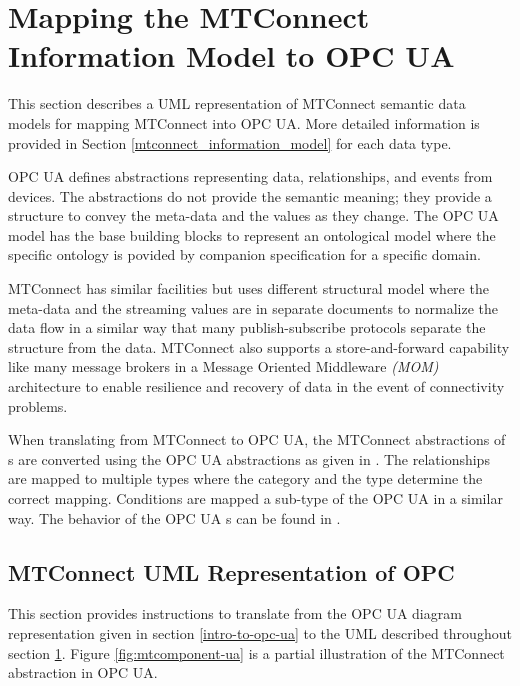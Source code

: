 \clearpage
\section{Mapping the MTConnect Information Model to OPC UA} 
  \label{mtconnect-mapping}

This section describes a UML representation of MTConnect semantic data models for mapping MTConnect into OPC UA. More detailed information is provided in Section \ref{mtconnect_information_model} for each data type.

OPC UA defines abstractions representing data, relationships, and events from devices. The abstractions do not provide the semantic meaning; they provide a structure to convey the meta-data and the values as they change. The OPC UA model has the base building blocks to represent an ontological model where the specific ontology is povided by companion specification for a specific domain.

MTConnect has similar facilities but uses different structural model where the meta-data and the streaming values are in separate documents to normalize the data flow in a similar way that many publish-subscribe protocols separate the structure from the data. MTConnect also supports a store-and-forward capability like many message brokers in a Message Oriented Middleware \textit{(MOM)} architecture to enable resilience and recovery of data in the event of connectivity problems.

When translating from MTConnect to OPC UA, the MTConnect abstractions of s are converted using the OPC UA   abstractions as given in \cite{UAPart8}.  The relationships are mapped to multiple  types where the category and the type determine the correct mapping. Conditions are mapped a sub-type of the OPC UA  in a similar way. The behavior of the OPC UA s can be found in \cite{UAPart9}.

\subsection{MTConnect UML Representation of OPC}

This section provides instructions to translate from the OPC UA diagram representation given in section \ref{intro-to-opc-ua} to the UML described throughout section \ref{mtconnect-mapping}. Figure \ref{fig:mtcomponent-ua} is a partial illustration of the MTConnect  abstraction in OPC UA.

